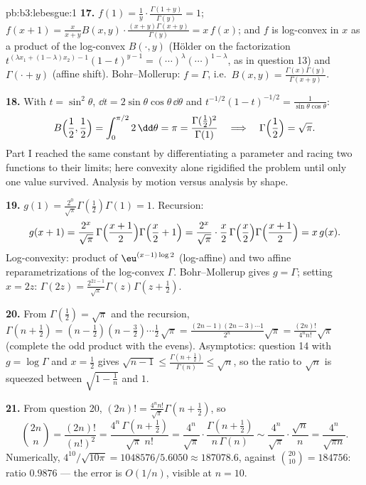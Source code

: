 \begin{solution}{pb:b3:lebesgue:1}
\textbf{17.} $f(1) = \frac1y\cdot\frac{\Gamma(1+y)}{\Gamma(y)}
= 1$; $f(x+1) = \frac{x}{x+y}B(x,y)\cdot\frac{(x+y)\Gamma(x+y)}
{\Gamma(y)} = x\,f(x)$; and $f$ is log-convex in $x$ as a
product of the log-convex $B(\cdot, y)$ (H\"older on the
factorization $t^{(\lambda x_1 + (1-\lambda)x_2)-1}(1-t)^{y-1}
= (\cdots)^\lambda(\cdots)^{1-\lambda}$, as in question 13)
and $\Gamma(\cdot + y)$ (affine shift). Bohr--Mollerup: $f =
\Gamma$, i.e.\ $B(x, y) =
\frac{\Gamma(x)\Gamma(y)}{\Gamma(x+y)}$.

\textbf{18.} With $t = \sin^2\theta$, $\dd t =
2\sin\theta\cos\theta\,\dd\theta$ and $t^{-1/2}(1-t)^{-1/2} =
\frac1{\sin\theta\cos\theta}$:
\[
B\Bigl(\frac12, \frac12\Bigr) =
\int_0^{\pi/2}2\,\dd\theta = \pi
= \frac{\Gamma(\frac12)^2}{\Gamma(1)}
\quad\Longrightarrow\quad
\Gamma\Bigl(\frac12\Bigr) = \sqrt\pi .
\]
Part I reached the same constant by differentiating a
parameter and racing two functions to their limits; here
convexity alone rigidified the problem until only one value
survived. Analysis by motion versus analysis by shape.

\textbf{19.} $g(1) = \frac{2^0}{\sqrt\pi}\Gamma(\frac12)
\Gamma(1) = 1$. Recursion:
\[
g(x+1) = \frac{2^{x}}{\sqrt\pi}\,
\Gamma\Bigl(\frac{x+1}2\Bigr)\Gamma\Bigl(\frac x2 + 1\Bigr)
= \frac{2^{x}}{\sqrt\pi}\cdot\frac x2\,
\Gamma\Bigl(\frac x2\Bigr)\Gamma\Bigl(\frac{x+1}2\Bigr)
= x\,g(x) .
\]
Log-convexity: product of $\eu^{(x-1)\log2}$ (log-affine) and
two affine reparametrizations of the log-convex $\Gamma$.
Bohr--Mollerup gives $g = \Gamma$; setting $x = 2z$:
$\Gamma(2z) = \frac{2^{2z-1}}{\sqrt\pi}\Gamma(z)\Gamma(z +
\frac12)$.

\textbf{20.} From $\Gamma(\frac12) = \sqrt\pi$ and the
recursion, $\Gamma(n + \frac12) = (n - \frac12)(n -
\frac32)\cdots\frac12\,\sqrt\pi =
\frac{(2n-1)(2n-3)\cdots1}{2^n}\sqrt\pi =
\frac{(2n)!}{4^nn!}\sqrt\pi$ (complete the odd product with
the evens). Asymptotics: question 14 with $g = \log\Gamma$
and $x = \frac12$ gives $\sqrt{n-1} \leq
\frac{\Gamma(n+\frac12)}{\Gamma(n)} \leq \sqrt n$, so the
ratio to $\sqrt n$ is squeezed between $\sqrt{1 - \frac1n}$
and $1$.

\textbf{21.} From question 20, $(2n)! =
\frac{4^nn!}{\sqrt\pi}\Gamma(n + \tfrac12)$, so
\[
\binom{2n}n = \frac{(2n)!}{(n!)^2}
= \frac{4^n\,\Gamma(n+\frac12)}{\sqrt\pi\;n!}
= \frac{4^n}{\sqrt\pi}\cdot
\frac{\Gamma(n+\frac12)}{n\,\Gamma(n)}
\sim \frac{4^n}{\sqrt\pi}\cdot\frac{\sqrt n}{n}
= \frac{4^n}{\sqrt{\pi n}} .
\]
Numerically, $4^{10}/\sqrt{10\pi} = 1048576/5.6050 \approx
187078.6$, against $\binom{20}{10} = 184756$: ratio $0.9876$
--- the error is $O(1/n)$, visible at $n = 10$.


\end{solution}
